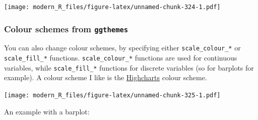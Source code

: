 \documentclass[]{gitbook}
\newenvironment{Shaded}{\begin{snugshade}}{\end{snugshade}}
\newcommand{\DataTypeTok}[1]{\textcolor[rgb]{0.13,0.29,0.53}{#1}}
\newcommand{\KeywordTok}[1]{\textcolor[rgb]{0.13,0.29,0.53}{\textbf{#1}}}
\newcommand{\NormalTok}[1]{#1}
\newcommand{\OperatorTok}[1]{\textcolor[rgb]{0.81,0.36,0.00}{\textbf{#1}}}
\newcommand{\StringTok}[1]{\textcolor[rgb]{0.31,0.60,0.02}{#1}}
\theoremstyle{definition}
\theoremstyle{definition}
\theoremstyle{definition}
\theoremstyle{remark}
\begin{document}
\texttt{[image: modern\_R\_files/figure-latex/unnamed-chunk-324-1.pdf]}

\hypertarget{colour-schemes-from-ggthemes}{%
\subsubsection{\texorpdfstring{Colour schemes from
\texttt{ggthemes}}{Colour schemes from ggthemes}}\label{colour-schemes-from-ggthemes}}

You can also change colour schemes, by specifying either
\texttt{scale\_colour\_*} or \texttt{scale\_fill\_*} functions.
\texttt{scale\_colour\_*} functions are used for continuous variables,
while \texttt{scale\_fill\_*} functions for discrete variables (so for
barplots for example). A colour scheme I like is the
\href{https://www.highcharts.com/}{Highcharts} colour scheme.

\begin{Shaded}
\end{Shaded}

\texttt{[image: modern\_R\_files/figure-latex/unnamed-chunk-325-1.pdf]}

An example with a barplot:
\end{document}
